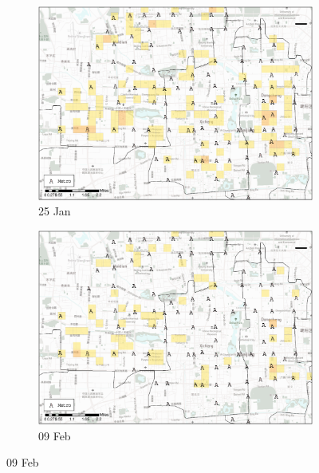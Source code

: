 \documentclass[preprints,ijgi,submit,moreauthors]{Definitions/mdpi}
\begin{document}
\begin{figure}[ht]
    \centering
    \begin{subfigure}{.334\textwidth}
        \includegraphics[width=\textwidth]{Figures/Relation_with_POIs/POI_metroD2020_01_25.eps}
        \caption{25 Jan}
    \end{subfigure}
    \begin{subfigure}{.334\textwidth}
        \includegraphics[width=\textwidth]{Figures/Relation_with_POIs/POI_metroD2020_02_09.eps}
        \caption{09 Feb}
    \end{subfigure}


\end{figure}
\end{document}

